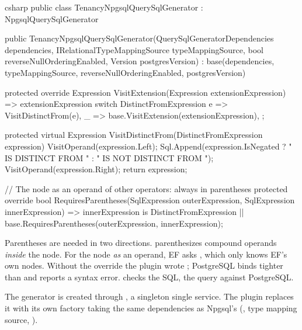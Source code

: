 \begin{sourcecode}{csharp}
public class TenancyNpgsqlQuerySqlGenerator : NpgsqlQuerySqlGenerator
{
    public TenancyNpgsqlQuerySqlGenerator(QuerySqlGeneratorDependencies dependencies,
        IRelationalTypeMappingSource typeMappingSource,
        bool reverseNullOrderingEnabled, Version postgresVersion)
        : base(dependencies, typeMappingSource, reverseNullOrderingEnabled, postgresVersion)
    {
    }

    protected override Expression VisitExtension(Expression extensionExpression)
        => extensionExpression switch
        {
            DistinctFromExpression e => VisitDistinctFrom(e),
            _ => base.VisitExtension(extensionExpression),
        };

    protected virtual Expression VisitDistinctFrom(DistinctFromExpression expression)
    {
        VisitOperand(expression.Left);
        Sql.Append(expression.IsNegated ? " IS DISTINCT FROM " : " IS NOT DISTINCT FROM ");
        VisitOperand(expression.Right);
        return expression;
    }

    // The node as an operand of other operators: always in parentheses
    protected override bool RequiresParentheses(SqlExpression outerExpression,
        SqlExpression innerExpression)
        => innerExpression is DistinctFromExpression
           || base.RequiresParentheses(outerExpression, innerExpression);
}
\end{sourcecode}

Parentheses are needed in two directions.  parenthesizes
compound operands \emph{inside} the node. For the node \emph{as} an operand, EF asks
, which only knows EF's own nodes. Without the override
the plugin wrote ; PostgreSQL binds
\code{<>} tighter than  and reports a syntax error.
 checks the SQL,
 the query against PostgreSQL.

The generator is created through
, a singleton single
service. The plugin replaces it with its own factory taking the same dependencies as
Npgsql's (, type
mapping source, ).

